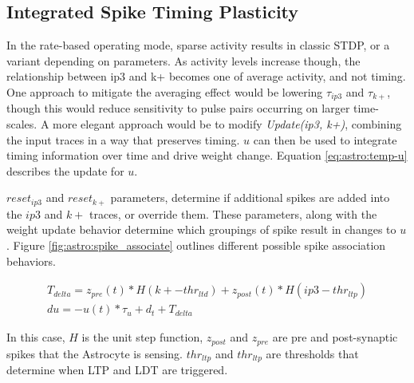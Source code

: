     
    
 
    \subsection{Integrated Spike Timing Plasticity}
    
    In the rate-based operating mode, sparse activity results in classic STDP,
    or a variant depending on parameters. As activity levels increase though,
    the relationship between ip3 and k+ becomes one of average activity, and not
    timing. One approach to mitigate the averaging effect would be lowering
    $\tau_{ip3}$ and $\tau_{k+}$, though this would reduce sensitivity to pulse
    pairs occurring on larger time-scales. A more elegant approach would be to
    modify \emph{Update(ip3, k+)}, combining the input traces in a way that
    preserves timing. $u$ can then be used to integrate timing information over
    time and drive weight change. Equation \ref{eq:astro:temp-u} describes the
    update for $u$.

    $reset_{ip3}$ and $reset_{k+}$ parameters, determine if additional spikes
    are added into the $ip3$ and $k+$ traces, or override them. These
    parameters, along with the weight update behavior determine which groupings
    of spike result in changes to $u$. Figure \ref{fig:astro:spike_associate}
    outlines different possible spike association behaviors.


    \begin{align}
      T_{delta} = z_{pre}(t) * H(k+ - thr_{ltd}) + z_{post}(t) * H(ip3 - thr_{ltp}) \\
      du = -u(t) * \tau_u + d_t + T_{delta} \label{eq:astro:temp-u}
    \end{align}

    In this case, $H$ is the unit step function, $z_{post}$ and $z_{pre}$ are
    pre and post-synaptic spikes that the Astrocyte is sensing. $thr_{ltp}$ and
    $thr_{ltp}$ are thresholds that determine when LTP and LDT are triggered.

